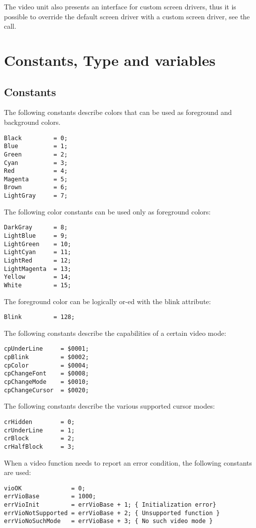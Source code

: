 The video unit also presents an interface for custom screen drivers, thus
it is possible to override the default screen driver with a custom screen 
driver, see the  call.

\section{Constants, Type and variables }

\subsection{Constants}
The following constants describe colors that can be used as 
foreground and background colors.
\begin{verbatim}
Black         = 0;
Blue          = 1;
Green         = 2;
Cyan          = 3;
Red           = 4;
Magenta       = 5;
Brown         = 6;
LightGray     = 7;
\end{verbatim}
The following color constants can be used only as foreground colors:
\begin{verbatim}
DarkGray      = 8;
LightBlue     = 9;
LightGreen    = 10;
LightCyan     = 11;
LightRed      = 12;
LightMagenta  = 13;
Yellow        = 14;
White         = 15;
\end{verbatim}
The foreground color can be logically or-ed with the blink attribute:
\begin{verbatim}
Blink         = 128;
\end{verbatim}
The following constants describe the capabilities of a certain video mode:
\begin{verbatim}
cpUnderLine     = $0001;
cpBlink         = $0002;
cpColor         = $0004;
cpChangeFont    = $0008;
cpChangeMode    = $0010;
cpChangeCursor  = $0020;
\end{verbatim}
The following constants describe the various supported cursor modes:
\begin{verbatim}
crHidden        = 0;
crUnderLine     = 1;
crBlock         = 2;
crHalfBlock     = 3;
\end{verbatim}
When a video function needs to report an error condition, the following
constants are used:
\begin{verbatim}
vioOK              = 0;
errVioBase         = 1000;
errVioInit         = errVioBase + 1; { Initialization error}
errVioNotSupported = errVioBase + 2; { Unsupported function }
errVioNoSuchMode   = errVioBase + 3; { No such video mode }
\end{verbatim}
